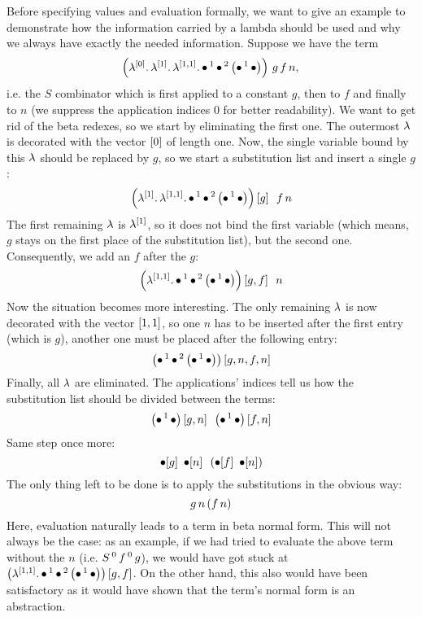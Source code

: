 \documentclass[submission,copyright,creativecommons]{eptcs}
\begin{document}
Before specifying values and evaluation formally, we want to give an example to demonstrate how the information carried by a lambda should be used and why we always have exactly the needed information. Suppose we have the term
\[
\left(\lambda ^{[0]} . \, \lambda ^{[1]} . \, \lambda ^{[1,1]} . \, \mathord{\bullet} \, ^{1} \, \mathord{\bullet} \, ^{2} \, {\left( \mathord{\bullet} \, ^{1} \, \mathord{\bullet} \right)}\right) \, g \, f \, n, \\ 
\]
i.e. the $S$ combinator which is first applied to a constant $g$, then to $f$ and finally to $n$ (we suppress the application indices $0$ for better readability). We want to get rid of the beta redexes, so we start by eliminating the first one. The outermost $\lambda$ is decorated with the vector $[0]$ of length one. Now, the single variable bound by this $\lambda$ should be replaced by $g$, so we start a substitution list and insert a single $g$:
\[
\left(\lambda ^{[1]} . \, \lambda ^{[1,1]} . \, \mathord{\bullet} \, ^{1} \, \mathord{\bullet} \, ^{2} \, {\left( \mathord{\bullet} \, ^{1} \, \mathord{\bullet} \right)}\right) \left[ g \right] \ \, f \, n
\]
The first remaining $\lambda$ is $\lambda^{[1]}$, so it does not bind the first variable (which means, $g$ stays on the first place of the substitution list), but the second one. Consequently, we add an $f$ after the $g$:
\[
\left(\lambda ^{[1,1]} . \, \mathord{\bullet} \, ^{1} \, \mathord{\bullet} \, ^{2} \, {\left( \mathord{\bullet} \, ^{1} \, \mathord{\bullet} \right)}\right)  \left[ g, f \right] \ \, n
\]
Now the situation becomes more interesting. The only remaining $\lambda$ is now decorated with the vector $[1,1]$, so one $n$ has to be inserted after the first entry (which is $g$), another one must be placed after the following entry:
\[
\left(\mathord{\bullet} \, ^{1} \, \mathord{\bullet} \, ^{2} \, {\left( \mathord{\bullet} \, ^{1} \, \mathord{\bullet} \right)}\right)  \left[ g, n, f, n \right]
\]
Finally, all $\lambda$ are eliminated. The applications' indices tell us how the substitution list should be divided between the terms:
\[
\left(\mathord{\bullet} \, ^{1} \, \mathord{\bullet}\right)\left[ g, n \right] \ \, \left(\mathord{\bullet} \, ^{1} \, \mathord{\bullet}\right) \left[ f, n \right]
\]
Same step once more:
\[
\mathord{\bullet}[g]  \ \, \mathord{\bullet}[n]  \ \, \left(\mathord{\bullet}[f]  \ \, \mathord{\bullet}[n]\right)
\]
The only thing left to be done is to apply the substitutions in the obvious way:
\[
g \, n  \, (f \, n)
\]
Here, evaluation naturally leads to a term in beta normal form. This will not always be the case: as an example, if we had tried to evaluate the above term without the $n$ (i.e. $S \, ^{0} \, f \, ^{0} \, g$), we would have got stuck at $\left(\lambda ^{[1,1]} . \, \mathord{\bullet} \, ^{1} \, \mathord{\bullet} \, ^{2} \, {\left( \mathord{\bullet} \, ^{1} \, \mathord{\bullet} \right)}\right)  \left[ g, f \right]$. On the other hand, this also would have been satisfactory as it would have shown that the term's normal form is an abstraction. %
\end{document}
